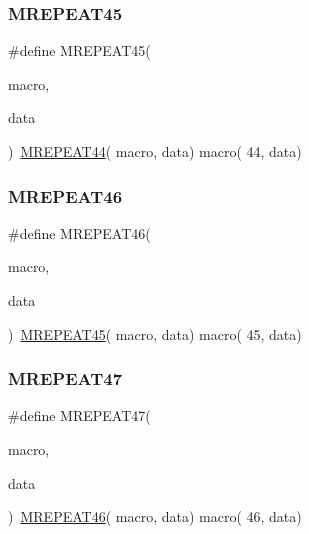 \mbox{\label{group__group__sam0__utils__mrepeat_ga98af56829d52d667c77077948d324447}} 
\subsubsection{\texorpdfstring{MREPEAT45}{MREPEAT45}}
{\footnotesize\ttfamily \#define M\+R\+E\+P\+E\+A\+T45(\begin{DoxyParamCaption}\item[{}]{macro,  }\item[{}]{data }\end{DoxyParamCaption})~\mbox{\hyperlink{group__group__sam0__utils__mrepeat_ga2b24fe07a9548203e922430255d5dba1}{M\+R\+E\+P\+E\+A\+T44}}( macro, data)   macro( 44, data)}

\mbox{\label{group__group__sam0__utils__mrepeat_gaaa292eca5c75fc09e042a941b69e077c}} 
\subsubsection{\texorpdfstring{MREPEAT46}{MREPEAT46}}
{\footnotesize\ttfamily \#define M\+R\+E\+P\+E\+A\+T46(\begin{DoxyParamCaption}\item[{}]{macro,  }\item[{}]{data }\end{DoxyParamCaption})~\mbox{\hyperlink{group__group__sam0__utils__mrepeat_ga98af56829d52d667c77077948d324447}{M\+R\+E\+P\+E\+A\+T45}}( macro, data)   macro( 45, data)}

\mbox{\label{group__group__sam0__utils__mrepeat_ga31b4cab8f91fc3ca6dbb6d4d501edc3c}} 
\subsubsection{\texorpdfstring{MREPEAT47}{MREPEAT47}}
{\footnotesize\ttfamily \#define M\+R\+E\+P\+E\+A\+T47(\begin{DoxyParamCaption}\item[{}]{macro,  }\item[{}]{data }\end{DoxyParamCaption})~\mbox{\hyperlink{group__group__sam0__utils__mrepeat_gaaa292eca5c75fc09e042a941b69e077c}{M\+R\+E\+P\+E\+A\+T46}}( macro, data)   macro( 46, data)}

